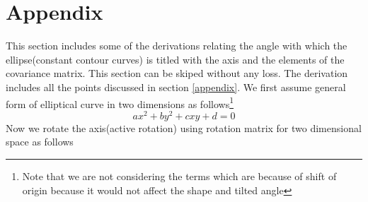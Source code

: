 \documentclass[a4paper]{article}
\begin{document}
\section{Appendix}
This section includes some of the derivations relating the angle with which the ellipse(constant contour curves) is titled with the axis and the elements of the covariance matrix. This section can be skiped without any loss. The derivation includes all the points discussed in section \ref{appendix}. We first assume general form of elliptical curve in two dimensions as follows\footnote{Note that we are not considering the terms which are because of shift of origin because it would not affect the shape and tilted angle}
\begin{equation}\label{original}
ax^{2}+by^{2}+cxy+d=0
\end{equation}Now we rotate the axis(active rotation) using rotation matrix for two dimensional space as follows
\end{document}
